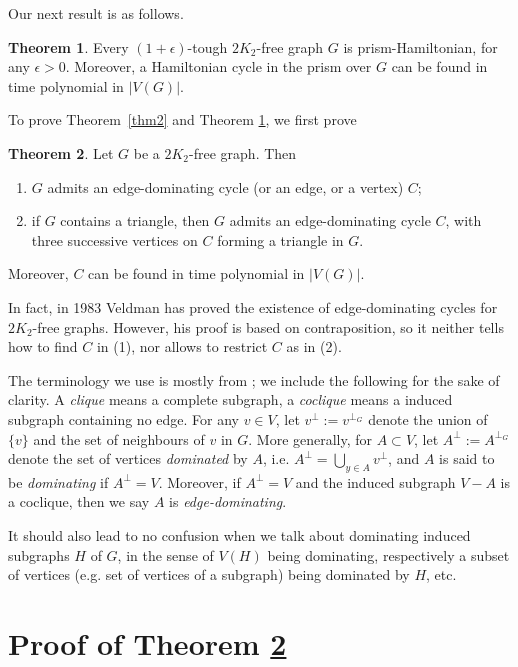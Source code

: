 \documentclass{amsart}
\theoremstyle{definition}
\newtheorem{theorem}{Theorem}
\begin{document}
Our next result is as follows.
\begin{theorem}\label{thm1}
Every $(1+\epsilon)$-tough $2K_2$-free graph $G$ is prism-Hamiltonian, for any $\epsilon>0$.
Moreover, a Hamiltonian cycle in the prism over $G$ can be found in time polynomial in $|V(G)|$.
\end{theorem}

To prove Theorem~\ref{thm2} and Theorem \ref{thm1}, we first prove
\begin{theorem}\label{addgen1} 
Let $G$ be a $2K_2$-free graph. Then
\begin{enumerate}
\item $G$ admits an edge-dominating cycle (or an edge, or a vertex) $C$; 
\item if $G$ contains a triangle, then $G$ admits 
an edge-dominating cycle $C$, with three successive vertices on $C$ forming a triangle in $G$. 
\end{enumerate}
Moreover, $C$ can be found in time polynomial in $|V(G)|$.
\end{theorem}

In fact, in 1983 Veldman \cite{veldman83} has proved the existence of
edge-dominating cycles for $2K_2$-free graphs. However, his proof is based on
contraposition, so it neither tells how to find $C$ in (1), nor
allows to restrict $C$ as in (2).

The terminology we use is  mostly from \cite{bomu08}; we include the following for the sake of
clarity.  
A {\em clique} means a complete subgraph, a {\em coclique} means a
induced subgraph containing no edge. 
For any
$v\in V$, let $v^\perp:=v^{\perp_G}$ denote the union of $\{v\}$ and the set of
neighbours of $v$ in $G$.  More generally, for $A\subset V$, let
$A^\perp:=A^{\perp_G}$ denote the set of vertices {\em dominated} by $A$, i.e.
$A^\perp=\bigcup\limits_{y\in A}v^\perp$, and $A$ is said to be {\em
dominating} if $A^\perp=V$.
Moreover, if $A^{\perp}=V$ and the induced subgraph $V-A$ is a coclique, then we say $A$ is {\em edge-dominating}. 
 
It should also lead to no confusion when we talk
about  dominating induced subgraphs $H$ of $G$, in the sense of $V(H)$ being
dominating, respectively a subset of vertices (e.g. set of vertices of a
subgraph) being dominated by $H$, etc.




\section{Proof of Theorem \ref{addgen1}}
\end{document}
